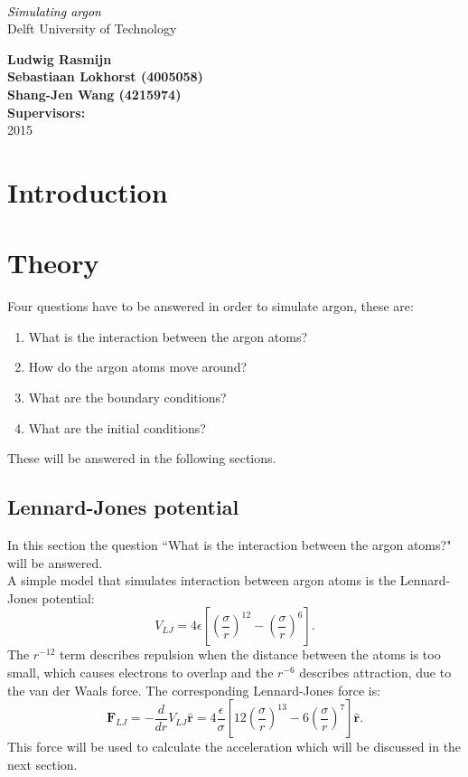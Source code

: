 \documentclass[12pt,a4paper]{report}
\newcommand*{\rotrt}[1]{\rotatebox{90}{#1}} %
\newcommand*{\rotlft}[1]{\rotatebox{-90}{#1}} %
\newcommand*{\titleBC}{\begingroup %
\centering %

\def\CP{\textit{\Large Simulating argon }} %

\settowidth{\unitlength}{\CP} %
{\color{CadetBlue}\resizebox*{\unitlength}{\baselineskip}{\rotrt{$\}$}}} \\[\baselineskip] %
\textcolor{Black}{\CP} \\[\baselineskip] %
{\color{Grey}\large Delft University of Technology} \\ %
{\color{CadetBlue}\resizebox*{\unitlength}{\baselineskip}{\rotlft{$\}$}}} %

\vfill %

{\large\textbf{Ludwig Rasmijn}}\\
{\large\textbf{Sebastiaan Lokhorst (4005058)}}\\
{\large\textbf{Shang-Jen Wang (4215974)}}\\
\bigskip
{\large\textbf{Supervisors:}}\\
{\large\textbf{ }}
\vfill %
\pagestyle{empty}
2015 %

\endgroup}
\begin{document}
\pagestyle{empty}
\titleBC
\newpage
\begin{abstract}
\noindent

\end{abstract}

\newpage
\tableofcontents

\newpage
\pagestyle{fancy}
\fancyhead{}
\fancyfoot{}
\renewcommand{\headrulewidth}{0pt}
\fancyfoot[C]{\thepage}
\listoffigures

\chapter{Introduction}

\chapter{Theory}
Four questions have to be answered in order to simulate argon, these are:
\begin{enumerate}
 \item What is the interaction between the argon atoms?
 \item How do the argon atoms move around?
 \item What are the boundary conditions?
 \item What are the initial conditions?
\end{enumerate}
These will be answered in the following sections.
\section{Lennard-Jones potential}
In this section the question ``What is the interaction between the argon atoms?" will be answered.\\
A simple model that simulates interaction between argon atoms is the Lennard-Jones potential:
\begin{equation}\label{eq:lennardjones}
V_{LJ}=4\epsilon \left[ \left( \frac{\sigma}{r} \right)^{12} - \left( \frac{\sigma}{r} \right)^{6} \right]\text{.}
\end{equation}
The $r^{-12}$ term describes repulsion when the distance between the atoms is too small, which causes electrons to overlap and the $r^{-6}$ describes attraction, due to the van der Waals force. The corresponding Lennard-Jones force is:
\begin{equation}\label{eq:lennardjonesforce}
\boldsymbol{F}_{LJ}=-\frac{d}{dr}V_{LJ}\hat{\boldsymbol{r}}=4\frac{\epsilon}{\sigma} \left[ 12\left( \frac{\sigma}{r} \right)^{13} - 6\left( \frac{\sigma}{r} \right)^{7} \right]\hat{\boldsymbol{r}}\text{.}
\end{equation}
This force will be used to calculate the acceleration which will be discussed in the next section.
\end{document}
